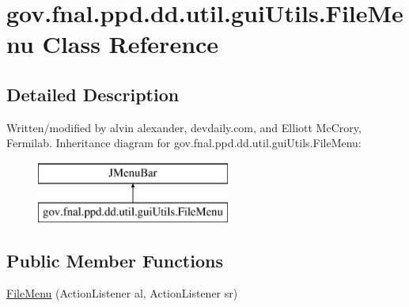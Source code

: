 \hypertarget{classgov_1_1fnal_1_1ppd_1_1dd_1_1util_1_1guiUtils_1_1FileMenu}{\section{gov.\-fnal.\-ppd.\-dd.\-util.\-gui\-Utils.\-File\-Menu Class Reference}
\label{classgov_1_1fnal_1_1ppd_1_1dd_1_1util_1_1guiUtils_1_1FileMenu}
}


\subsection{Detailed Description}
Written/modified by alvin alexander, devdaily.\-com, and Elliott Mc\-Crory, Fermilab. Inheritance diagram for gov.\-fnal.\-ppd.\-dd.\-util.\-gui\-Utils.\-File\-Menu\-:\begin{figure}[H]
\begin{center}
\leavevmode
\includegraphics[height=2.000000cm]{classgov_1_1fnal_1_1ppd_1_1dd_1_1util_1_1guiUtils_1_1FileMenu}
\end{center}
\end{figure}
\subsection*{Public Member Functions}
\begin{DoxyCompactItemize}
\item 
\hyperlink{classgov_1_1fnal_1_1ppd_1_1dd_1_1util_1_1guiUtils_1_1FileMenu_a1f837a05041451ddfa13a6a8f84ceaab}{File\-Menu} (Action\-Listener al, Action\-Listener sr)
\end{DoxyCompactItemize}
